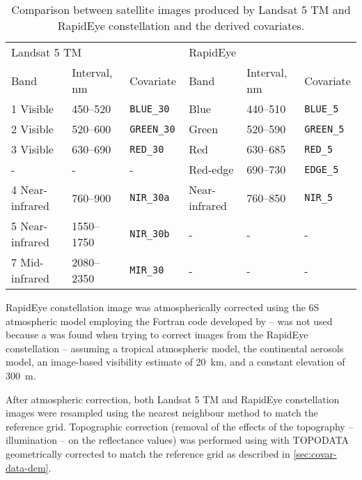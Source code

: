 \begin{table}[ht]
 \caption{Comparison between satellite images produced by Landsat 5 TM and RapidEye constellation and 
 the derived covariates.}
 \label{tab:covar-data-satellites}
 \centering
 {\small
 \begin{tabular}{llllll}
  \hline
  \multicolumn{3}{l}{Landsat 5 TM}                       & \multicolumn{3}{l}{RapidEye}                     \\
  Band            & Interval, \si{nm}    & Covariate     & Band         & Interval, \si{\nm} & Covariate    \\
  \hline
  1 Visible       &\numrange{450}{520}   &\tt{BLUE\_30}  &Blue          &\numrange{440}{510} &\tt{BLUE\_5}  \\
  2 Visible       &\numrange{520}{600}   &\tt{GREEN\_30} &Green         &\numrange{520}{590} &\tt{GREEN\_5} \\
  3 Visible       &\numrange{630}{690}   &\tt{RED\_30}   &Red           &\numrange{630}{685} &\tt{RED\_5}   \\
  -               &-                     & -             &Red-edge      &\numrange{690}{730} &\tt{EDGE\_5}  \\
  4 Near-infrared &\numrange{760}{900}   &\tt{NIR\_30a}  &Near-infrared &\numrange{760}{850} &\tt{NIR\_5}   \\
  5 Near-infrared &\numrange{1550}{1750} &\tt{NIR\_30b}  & -            & -                  & -            \\
  7 Mid-infrared  &\numrange{2080}{2350} &\tt{MIR\_30}   & -            & -                  & -            \\
  \hline
 \end{tabular}}
\end{table}

RapidEye constellation image was atmospherically corrected using the 6S atmospheric model 
\cite{VermoteEtAl1997} employing the Fortran code developed by  -- 
 was not used because a \atcorrbug{} was found when trying to correct images from the RapidEye 
constellation -- assuming a tropical atmospheric model, the continental aerosols model, an image-based 
visibility estimate of \SI{20}{\km}, and a constant elevation of \SI{300}{\m}.

After atmospheric correction, both Landsat 5 TM and RapidEye constellation images were resampled using the 
nearest neighbour method to match the reference grid. Topographic correction (removal of the effects of the 
topography -- illumination -- on the reflectance values) was performed using  with TOPODATA 
geometrically corrected to match the reference grid as described in \autoref{sec:covar-data-dem}.


